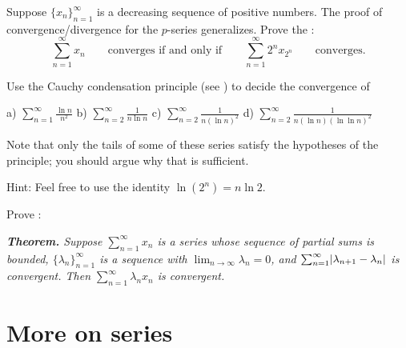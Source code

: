 \begin{exercise}[Challenging] \label{exercise:cauchycondensation}
Suppose $\{ x_n\}_{n=1}^\infty$ is a decreasing sequence of positive numbers.
The proof of convergence/divergence for the $p$-series generalizes.
Prove the
\emph{}:
\begin{equation*}
\sum_{n=1}^\infty x_n
\qquad \text{converges if and only if} \qquad
\sum_{n=1}^\infty 2^n x_{2^n} \qquad \text{converges}.
\end{equation*}
\end{exercise}

\begin{exercise}
Use the Cauchy condensation principle
(see )
to decide the convergence of

\medskip

\noindent
a) $\displaystyle \sum_{n=1}^\infty \frac{\ln n}{n^2}$
\qquad
b) $\displaystyle \sum_{n=2}^\infty \frac{1}{n \ln n}$
\qquad
c) $\displaystyle \sum_{n=2}^\infty \frac{1}{n {(\ln n)}^2}$
\qquad
d) $\displaystyle \sum_{n=2}^\infty \frac{1}{n (\ln n ){(\ln \ln n)}^2}$

\medskip

\noindent
Note that only the tails of some of these series satisfy the
hypotheses of the principle; you should argue why that is sufficient.

\noindent
Hint: Feel free to use the identity $\ln (2^n) = n \ln 2$.
\end{exercise}

\begin{exercise}[Challenging]
Prove \emph{}:

\medskip

\noindent
\emph{\textbf{Theorem.} Suppose $\sum_{n=1}^\infty x_n$ is a series whose sequence of partial sums
is bounded, $\{ \lambda_n \}_{n=1}^\infty$ is a sequence with
$\lim_{n\to\infty} \lambda_n = 0$, and
$\sum_{n=1}^\infty \lvert { \lambda_{n+1} - \lambda_n } \rvert$ is convergent.
Then $\sum_{n=1}^\infty \lambda_n x_n$ is convergent.}
\end{exercise}




\sectionnewpage
\section{More on series}
\label{sec:moreonseries}

